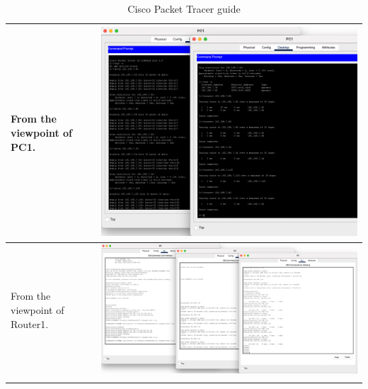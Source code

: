 \documentclass[11pt,a4paper]{report}
\begin{document}
\begin{flushleft}
\begin{center}
\begin{longtable}{ m{5cm} l }
                        From the viewpoint of PC1.                                                                                                                                                                                                                                                                                                                                                                  & \includegraphics[scale=0.34 ,valign=c]{p2-connecting2lanswithrouter/PC1_cmdall}           \\ \hline
                        From the viewpoint of Router1.                                                                                                                                                                                                                                                                                                                                                              & \includegraphics[scale=0.202,valign=c]{p2-connecting2lanswithrouter/R1-cliall}            \\ \hline

                        \caption{Cisco Packet Tracer guide}
                        \label{tab:cptg2}
                    \end{longtable}
                \end{center}
        \end{flushleft}
\end{document}
